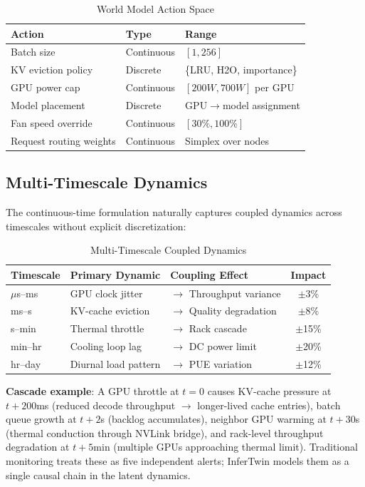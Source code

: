\documentclass[conference,10pt]{IEEEtran}
\begin{document}
\begin{table}[!htbp]
\caption{World Model Action Space}
\label{tab:actions}
\centering\scriptsize
\begin{tabular}{@{}lll@{}}
\toprule
\textbf{Action} & \textbf{Type} & \textbf{Range} \\
\midrule
Batch size & Continuous & $[1, 256]$ \\
KV eviction policy & Discrete & \{LRU, H2O, importance\} \\
GPU power cap & Continuous & $[200W, 700W]$ per GPU \\
Model placement & Discrete & GPU$\to$model assignment \\
Fan speed override & Continuous & $[30\%, 100\%]$ \\
Request routing weights & Continuous & Simplex over nodes \\
\bottomrule
\end{tabular}
\end{table}

\subsection{Multi-Timescale Dynamics}

The continuous-time formulation naturally captures coupled dynamics across timescales without explicit discretization:

\begin{table}[!htbp]
\caption{Multi-Timescale Coupled Dynamics}
\label{tab:timescale}
\centering\scriptsize
\begin{tabular}{@{}lllc@{}}
\toprule
\textbf{Timescale} & \textbf{Primary Dynamic} & \textbf{Coupling Effect} & \textbf{Impact} \\
\midrule
$\mu$s--ms & GPU clock jitter & $\to$ Throughput variance & $\pm$3\% \\
ms--s & KV-cache eviction & $\to$ Quality degradation & $\pm$8\% \\
s--min & Thermal throttle & $\to$ Rack cascade & $\pm$15\% \\
min--hr & Cooling loop lag & $\to$ DC power limit & $\pm$20\% \\
hr--day & Diurnal load pattern & $\to$ PUE variation & $\pm$12\% \\
\bottomrule
\end{tabular}
\end{table}

\textbf{Cascade example}: A GPU throttle at $t{=}0$ causes KV-cache pressure at $t{+}200$ms (reduced decode throughput $\to$ longer-lived cache entries), batch queue growth at $t{+}2$s (backlog accumulates), neighbor GPU warming at $t{+}30$s (thermal conduction through NVLink bridge), and rack-level throughput degradation at $t{+}5$min (multiple GPUs approaching thermal limit). Traditional monitoring treats these as five independent alerts; InferTwin models them as a single causal chain in the latent dynamics.
\end{document}
